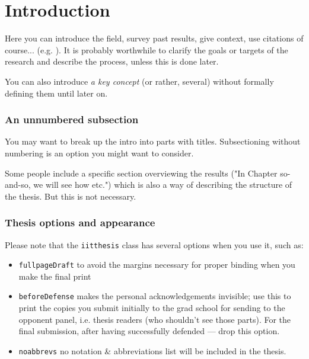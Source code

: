 \chapter{Introduction}
\label{chap:intro}


Here you can introduce the field, survey past results, give context, use citations of course... (e.g. \cite{CLR}). It is probably worthwhile to clarify the goals or targets of the research and describe the process, unless this is done later.

You can also introduce \emph{a key concept} (or rather, several) without formally defining them until later on.

\subsection*{An unnumbered subsection}

You may want to break up the intro into parts with titles. Subsectioning without numbering is an option you might want to consider.

Some people include a specific section overviewing the results ("In Chapter so-and-so, we will see how etc.") which is also a way of describing the structure of the thesis. But this is not necessary.

\subsection*{Thesis options and appearance}

Please note that the \texttt{iitthesis} class has several options when you use it, such as:
\begin{itemize}
\item \texttt{fullpageDraft} to avoid the margins necessary for proper binding when you make the final print
\item \texttt{beforeDefense} makes the personal acknowledgements invisible; use this to print the copies you submit initially to the grad school for sending to the opponent panel, i.e. thesis readers (who shouldn't see those parts). For the final submission, after having successfully defended --- drop this option. 
\item \texttt{noabbrevs} no notation \& abbreviations list will be included in the thesis.
\end{itemize}


